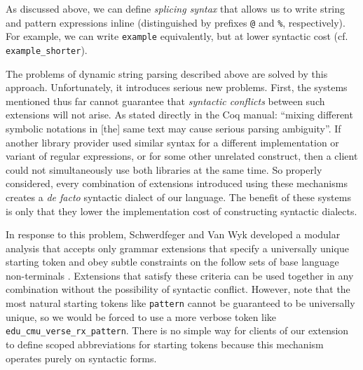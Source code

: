 As discussed above, we can define \emph{splicing syntax} that allows us to write string and pattern expressions inline (distinguished by prefixes \lstinline{@} and \lstinline{%}, respectively). 
For example, we can write \lstinline{example} equivalently, but at lower syntactic cost (cf. \lstinline{example_shorter}).

The problems of dynamic string parsing described above are solved by this approach. Unfortunately, it introduces serious new problems. First, the systems mentioned thus far cannot guarantee that \emph{syntactic conflicts} between such extensions will not arise. As stated directly in the  Coq manual: ``mixing different symbolic notations in [the] same text may cause serious parsing ambiguity''. If another library provider used similar syntax for a different implementation or variant of regular expressions, or for some other unrelated construct, then a client could not simultaneously use both libraries at the same time. So properly considered, every combination of extensions introduced using these mechanisms creates a \emph{de facto} syntactic dialect of our language. The benefit of these systems is only that they lower the implementation cost of constructing syntactic dialects. %

In response to this problem, Schwerdfeger and Van Wyk developed a modular analysis that accepts only grammar extensions that specify a universally unique starting token and obey subtle constraints on  the follow sets of base language non-terminals \cite{conf/pldi/SchwerdfegerW09}. Extensions that satisfy these criteria can be used together in any combination without the possibility of syntactic conflict. However, note that the most natural starting tokens like \lstinline{pattern} cannot be guaranteed to be universally unique, so we would be forced to use a more verbose token like \lstinline{edu_cmu_verse_rx_pattern}. There is no simple way for clients of our extension to define scoped abbreviations for starting tokens because this mechanism operates purely on syntactic forms.

